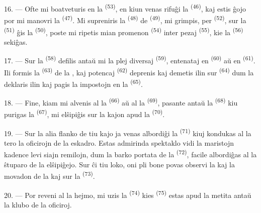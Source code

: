 16. --- Ofte mi boatveturis en la  \textsuperscript{(53)}, en
kiun venas rifuĝi la  \textsuperscript{(46)}, kaj estis ĝojo por
mi manovri la  \textsuperscript{(47)}. Mi supreniris la
 \textsuperscript{(48)} de 
\textsuperscript{(49)}, mi grimpis, per 
\textsuperscript{(52)}, sur la  \textsuperscript{(51)} ĝis la
 \textsuperscript{(50)}, poste mi ripetis mian promenon
 \textsuperscript{(54)} inter pezaj 
\textsuperscript{(55)}, kie la  \textsuperscript{(56)} sekiĝas.

17. --- Sur la  \textsuperscript{(58)} defilis antaŭ mi la plej
diversaj  \textsuperscript{(59)}, entenataj en 
\textsuperscript{(60)} aŭ en  \textsuperscript{(61)}. Ili formis
la  \textsuperscript{(63)} de la , kaj potencaj
 \textsuperscript{(62)} deprenis kaj demetis ilin sur
 \textsuperscript{(64)} dum la 
deklaris ilin kaj pagis la impostojn en la 
\textsuperscript{(65)}.

18. --- Fine, kiam mi alvenis al la  \textsuperscript{(66)} aŭ
al la  \textsuperscript{(69)}, pasante antaŭ la
 \textsuperscript{(68)} kiu purigas la 
\textsuperscript{(67)}, mi elŝipiĝis sur la kajon apud la 
\textsuperscript{(70)}.

19. --- Sur la alia flanko de tiu kajo ja venas albordiĝi la 
\textsuperscript{(71)} kiuj kondukas al la tero la oficirojn de la eskadro.
Estas admirinda spektaklo vidi la maristojn kadence levi siajn remilojn, dum
la barko portata de la  \textsuperscript{(72)}, facile albordiĝas
al la ŝtuparo de la elŝipiĝejo. Sur ĉi tiu loko, oni pli bone povas observi la
 kaj la movadon de la  kaj  sur
la  \textsuperscript{(73)}.

\VUsaut{3.0mm}
\VUsaut{3.0mm}

20. --- Por reveni al la hejmo, mi uzis la 
\textsuperscript{(74)} kies  \textsuperscript{(75)} estas apud
la  metita antaŭ la klubo de la oficiroj.

